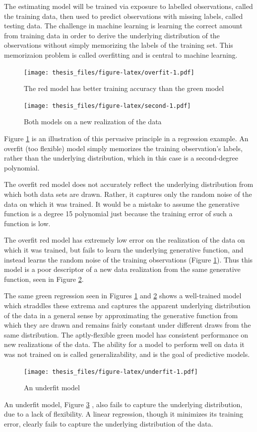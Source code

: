 \documentclass[12pt,twoside]{reedthesis}
\begin{document}
The estimating model will be trained via exposure to labelled
observations, called the training data, then used to predict
observations with missing labels, called testing data. The challenge in
machine learning is learning the correct amount from training data in
order to derive the underlying distribution of the observations without
simply memorizing the labels of the training set. This memorizaion
problem is called overfitting and is central to machine learning.
\begin{figure}
\centering
\texttt{[image: thesis\_files/figure-latex/overfit-1.pdf]}
\caption{\label{fig:overfit}The red model has better training accuracy than
the green model}
\end{figure}
\begin{figure}
\centering
\texttt{[image: thesis\_files/figure-latex/second-1.pdf]}
\caption{\label{fig:second}Both models on a new realization of the data}
\end{figure}
Figure \ref{fig:overfit} is an illustration of this pervasive principle
in a regression example. An overfit (too flexible) model simply
memorizes the training observation's labels, rather than the underlying
distribution, which in this case is a second-degree polynomial.

The overfit red model does not accurately reflect the underlying
distribution from which both data sets are drawn. Rather, it captures
only the random noise of the data on which it was trained. It would be a
mistake to assume the generative function is a degree 15 polynomial just
because the training error of such a function is low.

The overfit red model has extremely low error on the realization of the
data on which it was trained, but fails to learn the underlying
generative function, and instead learns the random noise of the training
observations (Figure \ref{fig:overfit}). Thus this model is a poor
descriptor of a new data realization from the same generative function,
seen in Figure \ref{fig:second}.

The same green regression seen in Figures \ref{fig:overfit} and
\ref{fig:second} shows a well-trained model which straddles these
extrema and captures the apparent underlying distribution of the data in
a general sense by approximating the generative function from which they
are drawn and remains fairly constant under different draws from the
same distribution. The aptly-flexible green model has consistent
performance on new realizations of the data. The ability for a model to
perform well on data it was not trained on is called generalizability,
and is the goal of predictive models.
\begin{figure}
\centering
\texttt{[image: thesis\_files/figure-latex/underfit-1.pdf]}
\caption{\label{fig:underfit}An underfit model}
\end{figure}
An underfit model, Figure \ref{fig:underfit} , also fails to capture the
underlying distribution, due to a lack of flexibility. A linear
regression, though it minimizes its training error, clearly fails to
capture the underlying distribution of the data.
\end{document}
